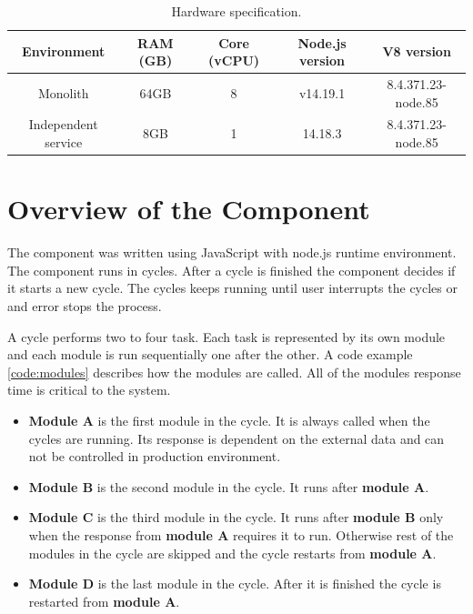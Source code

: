 \begin{table}[h!]
    \begin{tabular}{|c|c|c|c|c|} 
        \hline
        Environment
        & RAM (GB)
        & Core (vCPU)
        & Node.js version
        & V8 version
        \\ 
        \hline\hline
        Monolith
        & 64GB
        & 8
        & v14.19.1
        & 8.4.371.23-node.85
        \\
        Independent service
        & 8GB
        & 1
        & 14.18.3
        & 8.4.371.23-node.85
        \\
        \hline
    \end{tabular}    
    \caption{Hardware specification.}
    \label{represented:harware:specs}
\end{table}

\section{Overview of the Component}
The component was written using JavaScript with node.js runtime environment.
The component runs in cycles.
After a cycle is finished the component decides if it starts a new cycle.
The cycles keeps running until user interrupts the cycles or and error stops the process.

A cycle performs two to four task.
Each task is represented by its own module and each module is run sequentially one after the other.
A code example \ref{code:modules} describes how the modules are called.
All of the modules response time is critical to the system.
\begin{itemize}
    \item
    \textbf{Module A} is the first module in the cycle.
    It is always called when the cycles are running. Its response is dependent on the external data and can not be controlled in production environment.
    
    \item
    \textbf{Module B} is the second module in the cycle.
    It runs after \textbf{module A}.
    
    \item
    \textbf{Module C} is the third module in the cycle.
    It runs after \textbf{module B} only when the response from \textbf{module A} requires it to run.
    Otherwise rest of the modules in the cycle are skipped and the cycle restarts from \textbf{module A}.

    \item
    \textbf{Module D} is the last module in the cycle.
    After it is finished the cycle is restarted from \textbf{module A}.
\end{itemize}

